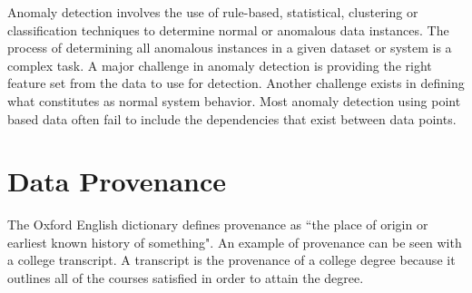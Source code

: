 


Anomaly detection involves the use of rule-based, statistical, clustering or classification techniques to determine normal or anomalous data instances. The process of determining all anomalous instances in a given dataset or system is a complex task. A major challenge in anomaly detection is providing the right feature set from the data to use for detection. Another challenge exists in defining what constitutes as normal system behavior. Most anomaly detection using point based data often fail to include the dependencies that exist between data points.   

\section{Data Provenance}
The Oxford English dictionary defines provenance \cite{TCDP1999} as ``the place of origin or earliest known history of something". An example of provenance can be seen with a college transcript. A transcript is the provenance of a college degree because it outlines all of the courses satisfied in order to attain the degree.


